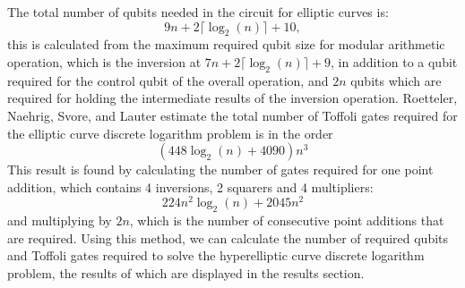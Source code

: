 \begin{table}
\caption{Costs for modular arithmetic in quantum circuits in terms of $n$, the bit-size of the prime which the group is defined over~\cite{roetteler2017quantum}}
\label{table:gateCosts}
\end{table}
The total number of qubits needed in the circuit for elliptic curves is: 
$$9n+2\lceil\log_2(n)\rceil + 10,$$ this is calculated from the maximum required qubit size for modular arithmetic operation, which is the inversion at $7n+2\lceil\log_2(n)\rceil + 9$, in addition to a qubit required for the control qubit of the overall operation, and $2n$ qubits which are required for holding the intermediate results of the inversion operation. Roetteler, Naehrig, Svore, and Lauter estimate the total number of Toffoli gates required for the elliptic curve discrete logarithm problem is in the order 
$$(448\log_2(n)+4090)n^3$$
This result is found by calculating the number of gates required for one point addition, which contains 4 inversions, 2 squarers and 4 multipliers:
$$224n^2\log_2(n) + 2045n^2$$
and multiplying by $2n$, which is the number of consecutive point additions that are required.
Using this method, we can calculate the number of required qubits and Toffoli gates required to solve the hyperelliptic curve discrete logarithm problem, the results of which are displayed in the results section.